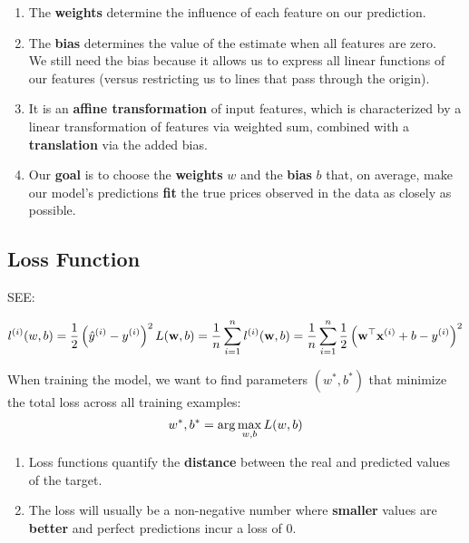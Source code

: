 \begin{enumerate}[itemsep=0.2cm]
    \item The \textbf{weights} determine the influence of each feature on our prediction. 
    
    \item The \textbf{bias} determines the value of the estimate when all features are zero.\\
    We still need the bias because it allows us to express all linear functions of our features (versus restricting us to lines that pass through the origin).

    \item It is an \textbf{affine transformation} of input features, which is characterized by a linear transformation of features via weighted sum, combined with a \textbf{translation} via the added bias. 

    \item Our \textbf{goal} is to choose the \textbf{weights} $w$ and the \textbf{bias} $b$ that, on average, make our model’s predictions \textbf{fit} the true prices observed in the data as closely as possible.

\end{enumerate}




\subsection{Loss Function \cite{dnn-1}}
SEE: 

\[
    l^{(i)}(w,b) = \frac{1}{2}\left( \hat{y}^{(i)} - y^{(i)}\right)^2
    \hfill
    {\displaystyle L(\mathbf{w}, b) =\frac{1}{n}\sum_{i=1}^n l^{(i)}(\mathbf{w}, b) =\frac{1}{n} \sum_{i=1}^n \frac{1}{2}\left(\mathbf{w}^\top \mathbf{x}^{(i)} + b - y^{(i)}\right)^2}
\]

When training the model, we want to find parameters $(w^\ast, b^\ast)$ that minimize the total loss
across all training examples:
\[
    \displaystyle
    \hfill
        w^\ast, b^\ast = \arg\max_{w,b} L(w,b)
    \hfill
\]


\begin{enumerate}[itemsep=0.2cm]
    \item Loss functions quantify the \textbf{distance} between the real and predicted values of the target.

    \item The loss will usually be a non-negative number where \textbf{smaller} values are \textbf{better} and perfect predictions incur a loss of $0$.

\end{enumerate}





